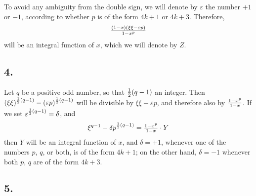 \documentclass[twoside,12pt]{memoir}
\let\oldfrac\frac
\def\frac#1#2{\mathchoice{\tfrac{#1}{#2}}{\oldfrac{#1}{#2}}{\genfrac{}{}{}{2}{#1}{#2\mathstrut}}{\genfrac{}{}{}{3}{#1}{#2\mathstrut}}}
\begin{document}
To avoid any ambiguity from the double sign, we will denote by \(\varepsilon\) the number \(+1\) or \(-1\), according to whether \(p\) is of the form \(4k+1\) or \(4k+3\). Therefore,
\[\frac{(1-x)(\xi \xi-\varepsilon p)}{1-x^{p}}\]
will be an integral function of \(x\), which we will denote by \(Z\).
%

\subsection*{4.}

Let \(q\) be a positive odd number, so that \(\frac{1}{2}(q-1)\) an integer. Then \((\xi \xi)^{\frac{1}{2}(q-1)}-(\varepsilon p)^{\frac{1}{2}(q-1)}\) will be divisible by \(\xi \xi-\varepsilon p\), and therefore also by \(\frac{1-x^{p}}{1-x}\). If we set \(\varepsilon^{\frac{1}{2}(q-1)}=\delta\), and
\[\xi^{q-1}-\delta p^{\frac{1}{2}(q-1)}=\frac{1-x^{p}}{1-x} \cdot Y\]
then \(Y\) will be an integral function of \(x\), and \(\delta=+1\), whenever one of the numbers \(p\), \(q\), or both, is of the form \(4k+1\); on the other hand, \(\delta=-1\) whenever both \(p\), \(q\) are of the form \(4k+3\).
%

\subsection*{5.}
\end{document}

